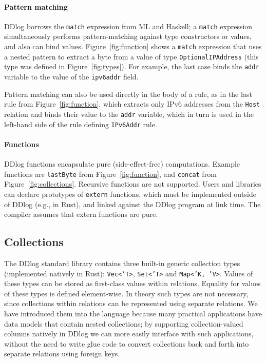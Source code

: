 \paragraph{Pattern matching}  DDlog borrows
the \texttt{match} expression from ML and Haskell; a \texttt{match}
expression simultaneously performs pattern-matching against type
constructors or values, and also can bind values.
Figure~\ref{fig:function} shows a \texttt{match} expression that uses
a nested pattern to extract a byte from a value of type
\texttt{OptionalIPAddress} (this type was defined in
Figure~\ref{fig:types}).  For example, the last case binds the
\texttt{addr} variable to the value of the \texttt{ipv6addr} field.

Pattern matching can also be used directly in the body of a rule, as
in the last rule from Figure~\ref{fig:function}, which extracts only
IPv6 addresses from the \texttt{Host} relation and binds their value
to the \texttt{addr} variable, which in turn is used in the left-hand side of
the rule defining \texttt{IPv6Addr} rule.

\paragraph{Functions}

DDlog functions encapsulate pure (side-effect-free) computations.
Example functions are \texttt{lastByte} from
Figure~\ref{fig:function}, and \texttt{concat} from
Figure~\ref{fig:collections}.  Recursive functions are not supported.
Users and libraries can declare prototypes of \texttt{extern}
functions, which must be implemented outside of DDlog (e.g., in Rust),
and linked against the DDlog program at link time.  The compiler
assumes that extern functions are pure.

\subsection{Collections}\label{sec:collections}

The DDlog standard library contains three built-in generic collection
types (implemented natively in Rust): \texttt{Vec<'T>},
\texttt{Set<'T>} and \texttt{Map<'K, 'V>}.  Values of these types can
be stored as first-class values within relations.  Equality for values
of these types is defined element-wise.  In theory such types are not
necessary, since collections within relations can be represented using
separate relations.  We have introduced them into the language because
many practical applications have data models that contain nested
collections; by supporting collection-valued columns natively in DDlog
we can more easily interface with such applications, without the need
to write glue code to convert collections back and forth into separate
relations using foreign keys.

